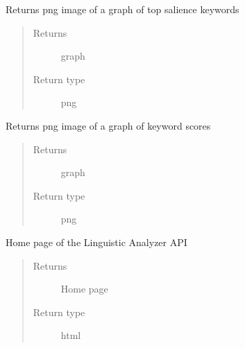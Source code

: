 \documentclass[letterpaper,10pt,english]{sphinxmanual}
\begin{document}

\begin{fulllineitems}
\label{\detokenize{app:app.getkwsalienceimage}}
Returns png image of a graph of top salience keywords
\begin{quote}\begin{description}
\item[{Returns}] \leavevmode
graph

\item[{Return type}] \leavevmode
png

\end{description}\end{quote}

\end{fulllineitems}


\begin{fulllineitems}
\label{\detokenize{app:app.getkwscoresimage}}
Returns png image of a graph of keyword scores
\begin{quote}\begin{description}
\item[{Returns}] \leavevmode
graph

\item[{Return type}] \leavevmode
png

\end{description}\end{quote}

\end{fulllineitems}


\begin{fulllineitems}
\label{\detokenize{app:app.main}}
Home page of the Linguistic Analyzer API
\begin{quote}\begin{description}
\item[{Returns}] \leavevmode
Home page

\item[{Return type}] \leavevmode
html

\end{description}\end{quote}

\end{fulllineitems}
\end{document}
